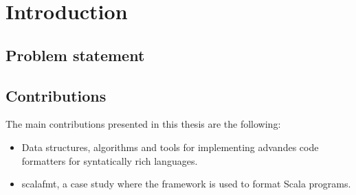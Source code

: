 
\section{Introduction} %
\label{sec:Introduction}

\subsection{Problem statement}
\subsection{Contributions}
The main contributions presented in this thesis are the following:
\begin{itemize}
    \item Data structures, algorithms and tools for implementing advandes code formatters for syntatically rich languages.
    \item scalafmt, a case study where the framework is used to format Scala programs.
\end{itemize}
